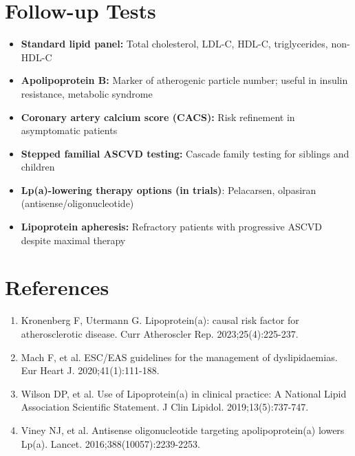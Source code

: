\section*{Follow-up Tests}
\begin{itemize}
  \item \textbf{Standard lipid panel:} Total cholesterol, LDL-C, HDL-C, triglycerides, non-HDL-C
  \item \textbf{Apolipoprotein B:} Marker of atherogenic particle number; useful in insulin resistance, metabolic syndrome
  \item \textbf{Coronary artery calcium score (CACS):} Risk refinement in asymptomatic patients
  \item \textbf{Stepped familial ASCVD testing:} Cascade family testing for siblings and children
  \item \textbf{Lp(a)-lowering therapy options (in trials)}: Pelacarsen, olpasiran (antisense/oligonucleotide)
  \item \textbf{Lipoprotein apheresis:} Refractory patients with progressive ASCVD despite maximal therapy
\end{itemize}

\section*{References}
\begin{enumerate}
  \item Kronenberg F, Utermann G. Lipoprotein(a): causal risk factor for atherosclerotic disease. Curr Atheroscler Rep. 2023;25(4):225-237.
  \item Mach F, et al. ESC/EAS guidelines for the management of dyslipidaemias. Eur Heart J. 2020;41(1):111-188.
  \item Wilson DP, et al. Use of Lipoprotein(a) in clinical practice: A National Lipid Association Scientific Statement. J Clin Lipidol. 2019;13(5):737-747.
  \item Viney NJ, et al. Antisense oligonucleotide targeting apolipoprotein(a) lowers Lp(a). Lancet. 2016;388(10057):2239-2253.
\end{enumerate}

\clearpage